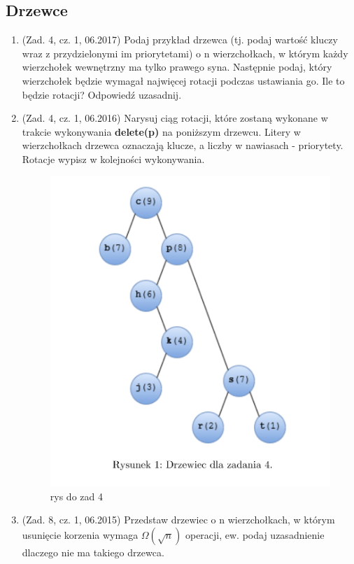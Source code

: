 \documentclass[10pt]{article}%
\begin{document}
\subsection*{Drzewce}

\begin{enumerate}

\item(Zad. 4, cz. 1, 06.2017) Podaj przykład drzewca (tj. podaj wartość kluczy wraz z przydzielonymi im priorytetami) o n wierzchołkach, w którym każdy wierzchołek wewnętrzny ma tylko prawego syna. Następnie podaj, który wierzchołek będzie wymagał najwięcej rotacji podczas ustawiania go. Ile to będzie rotacji? Odpowiedź uzasadnij.

\item (Zad. 4, cz. 1, 06.2016) Narysuj ciąg rotacji, które zostaną wykonane w trakcie wykonywania \textbf{delete(p)} na poniższym drzewcu. Litery w wierzchołkach drzewca oznaczają klucze, a liczby w nawiasach - priorytety. Rotacje wypisz w kolejności wykonywania.
\begin{figure}[H]
	\begin{center}
		\includegraphics[scale=0.4]{z40616.png}
	\end{center}
	\caption{rys do zad 4}
\end{figure}

\item (Zad. 8, cz. 1, 06.2015) Przedstaw drzewiec o n wierzchołkach, w którym usunięcie korzenia wymaga $\Omega(\sqrt{n})$ operacji, ew. podaj uzasadnienie dlaczego nie ma takiego drzewca.

\end{enumerate}
\end{document}
